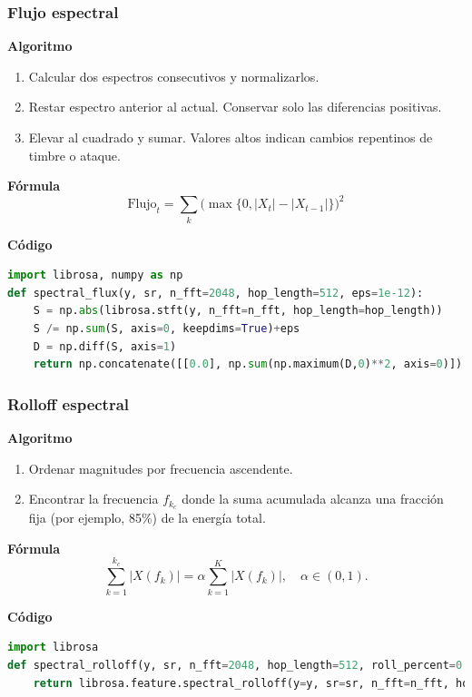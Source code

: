 \subsubsection{Flujo espectral}
\textbf{Algoritmo} \parencite{foote1999novelty, muller2015fmp}
\begin{enumerate}
    \item Calcular dos espectros consecutivos y normalizarlos.
    \item Restar espectro anterior al actual. Conservar solo las diferencias positivas.
    \item Elevar al cuadrado y sumar. Valores altos indican cambios repentinos de timbre o ataque.
\end{enumerate}

\textbf{Fórmula}
\[
\text{Flujo}_t=\sum_k\big(\max\{0, |X_t|-|X_{t-1}|\}\big)^2
\]

\textbf{Código}
\begin{lstlisting}[language=Python, label={lst:flux_code}, caption={Flujo espectral}]
import librosa, numpy as np
def spectral_flux(y, sr, n_fft=2048, hop_length=512, eps=1e-12):
    S = np.abs(librosa.stft(y, n_fft=n_fft, hop_length=hop_length))
    S /= np.sum(S, axis=0, keepdims=True)+eps
    D = np.diff(S, axis=1)
    return np.concatenate([[0.0], np.sum(np.maximum(D,0)**2, axis=0)])
\end{lstlisting}

\subsubsection{Rolloff espectral}
\textbf{Algoritmo} \parencite{tzanetakis2002musical, peeters2004large}
\begin{enumerate}
    \item Ordenar magnitudes por frecuencia ascendente.
    \item Encontrar la frecuencia \(f_{k_c}\) donde la suma acumulada alcanza una fracción fija (por ejemplo, 85\%) de la energía total.
\end{enumerate}

\textbf{Fórmula}
\[
\sum_{k=1}^{k_c}|X(f_k)|=\alpha\sum_{k=1}^{K}|X(f_k)|,\quad \alpha\in(0,1).
\]

\textbf{Código}
\begin{lstlisting}[language=Python, label={lst:rolloff_code}, caption={Rolloff espectral}]
import librosa
def spectral_rolloff(y, sr, n_fft=2048, hop_length=512, roll_percent=0.85):
    return librosa.feature.spectral_rolloff(y=y, sr=sr, n_fft=n_fft, hop_length=hop_length, roll_percent=roll_percent)[0]
\end{lstlisting}

